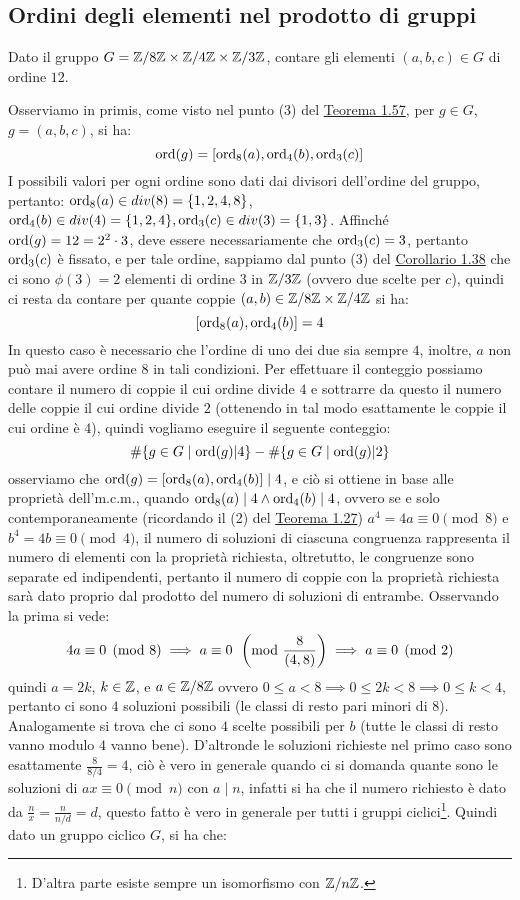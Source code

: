 \documentclass[11pt]{scrartcl}
\begin{document}
\subsection{Ordini degli elementi nel prodotto di gruppi}
\begin{exercise}
\label{exA6}
Dato il gruppo $G = \mathbb Z/8\mathbb Z \times \mathbb Z/4\mathbb Z \times \mathbb Z/3\mathbb Z$, contare gli elementi $(a,b,c) \in G$ di ordine $12$.
\end{exercise}

\begin{soln}
Osserviamo in primis, come visto nel punto (3) del \hyperref[g:ProdottoDiretto]{Teorema 1.57}, per $g \in G$, $g=(a,b,c)$, si ha:
	\[ \operatorname{ord}(g) = [\operatorname{ord}_8(a), \operatorname{ord}_4(b), \operatorname{ord}_3 (c)]
	\]
I possibili valori per ogni ordine sono dati dai divisori dell'ordine del gruppo, pertanto: $\operatorname{ord}_8(a) \in div(8) = \{1,2,4,8\}$,  $\operatorname{ord}_4(b) \in div(4) = \{1,2,4\}, \operatorname{ord}_3(c) \in div(3) = \{1,3\}$. Affinché $\operatorname{ord}(g) = 12 = 2^2 \cdot 3$, deve essere necessariamente che $\operatorname{ord}_3(c) = 3$, pertanto $\operatorname{ord}_3(c)$ è fissato, e per tale ordine, sappiamo dal punto (3) del \hyperref[g:ordiniZn]{Corollario 1.38} che ci sono $\phi(3)=2$ elementi di ordine $3$ in $\mathbb Z/3\mathbb Z$ (ovvero due scelte per $c$), quindi ci resta da contare per quante coppie $(a,b) \in \mathbb Z/8\mathbb Z \times \mathbb Z/4\mathbb Z$ si ha:
	\[ [\operatorname{ord}_8(a),\operatorname{ord}_4(b)] = 4
	\]
In questo caso è necessario che l'ordine di uno dei due sia sempre $4$, inoltre, $a$ non può mai avere ordine $8$ in tali condizioni. Per effettuare il conteggio possiamo contare il numero di coppie il cui ordine divide $4$ e sottrarre da questo il numero delle coppie il cui ordine divide $2$ (ottenendo in tal modo esattamente le coppie il cui ordine è $4$), quindi vogliamo eseguire il seguente conteggio:
	\[ \#\{g \in G \mid \operatorname{ord}(g)|4\} - \#\{g \in G \mid \operatorname{ord}(g)|2\}
	\]
osserviamo che $\operatorname{ord}(g) =  [\operatorname{ord}_8(a),\operatorname{ord}_4(b)] \mid 4$, e ciò si ottiene in base alle proprietà dell'm.c.m., quando $\operatorname{ord}_8(a) \mid 4 \land \operatorname{ord}_4(b) \mid 4$, ovvero se e solo contemporaneamente (ricordando il (2) del \hyperref[thm:g_due]{Teorema 1.27}) $a^4 = 4a \equiv 0 \pmod 8$ e $b^4 = 4b \equiv 0 \pmod 4$, il numero di soluzioni di ciascuna congruenza rappresenta il numero di elementi con la proprietà richiesta, oltretutto, le congruenze sono separate ed indipendenti, pertanto il numero di coppie con la proprietà richiesta sarà dato proprio dal prodotto del numero di soluzioni di entrambe. Osservando la prima si vede:
	\[ 4a \equiv 0 \pmod 8 \implies a \equiv 0 \myPMod{\frac{8}{(4,8)}} 	\implies a \equiv 0 \pmod 2
	\]
quindi $a = 2k$, $k \in \mathbb Z$, e $a \in \mathbb Z/8\mathbb Z$ ovvero $0 \leq a < 8 \implies 0 \leq 2k < 8 \implies 0 \leq k < 4$, pertanto ci sono $4$ soluzioni possibili (le classi di resto pari minori di $8$). Analogamente si trova che ci sono $4$ scelte possibili per $b$ (tutte le classi di resto vanno modulo $4$ vanno bene). D'altronde le soluzioni richieste nel primo caso sono esattamente $\displaystyle \frac{8}{8/4} = 4$, ciò è vero in generale quando ci si domanda quante sono le soluzioni di $ax \equiv 0 \pmod n$ con $a \mid n$, infatti si ha che il numero richiesto è dato da $\displaystyle\frac{n}{x} = \frac{n}{n/d} = d$, questo fatto è vero in generale per tutti i gruppi ciclici\footnote{D'altra parte esiste sempre un isomorfismo con $\mathbb Z/n\mathbb Z$.}. Quindi dato un gruppo ciclico $G$, si ha che:

\end{soln}
\end{document}
